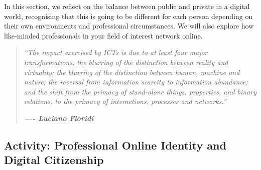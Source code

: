 \documentclass[
]{book}
\theoremstyle{definition}
\theoremstyle{definition}
\theoremstyle{definition}
\theoremstyle{definition}
\theoremstyle{remark}
\begin{document}
In this section, we reflect on the balance between public and private in a digital world, recognising that this is going to be different for each person depending on their own environments and professional circumstances. We will also explore how like-minded professionals in your field of interest network online.

\begin{quote}
\emph{``The impact exercised by ICTs is due to at least four major transformations: the blurring of the distinction between reality and virtuality; the blurring of the distinction between human, machine and nature; the reversal from information scarcity to information abundance; and the shift from the primacy of stand-alone things, properties, and binary relations, to the primacy of interactions, processes and networks.''}

\textbf{\emph{---- Luciano Floridi}}
\end{quote}

\hypertarget{activity-professional-online-identity-and-digital-citizenship}{%
\subsection*{Activity: Professional Online Identity and Digital Citizenship}\label{activity-professional-online-identity-and-digital-citizenship}}
\end{document}
